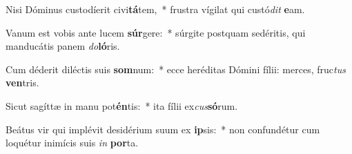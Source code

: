 \item Nisi Dóminus custodíerit civi\textbf{tá}tem,~* frustra vígilat qui custó\textit{dit} \textbf{e}am.
\item Vanum est vobis ante lucem \textbf{súr}gere:~* súrgite postquam sedéritis, qui manducátis panem \textit{do}\textbf{ló}ris.
\item Cum déderit diléctis suis \textbf{som}num:~* ecce heréditas Dómini fílii: merces, fruc\textit{tus} \textbf{ven}tris.
\item Sicut sagíttæ in manu pot\textbf{én}tis:~* ita fílii ex\textit{cus}\textbf{só}rum.
\item Beátus vir qui implévit desidérium suum ex \textbf{ip}sis:~* non confundétur cum loquétur inimícis suis \textit{in} \textbf{por}ta.
